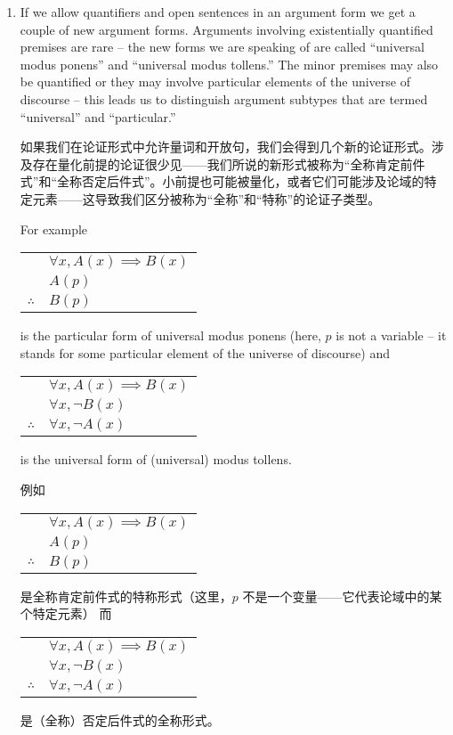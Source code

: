 \begin{enumerate}
{  \vfill
  }
  
  \workbookpagebreak
  
  \item If we allow quantifiers and open sentences in an argument form we
  get a couple of new argument forms.
  Arguments involving existentially quantified 
  premises are rare -- the new forms we are speaking of are called ``universal modus 
  ponens'' and ``universal modus tollens.''   The minor premises may also be quantified
  or they may involve particular elements of the universe of discourse -- this leads
  us to distinguish argument subtypes that are termed ``universal'' and ``particular.''
  
  如果我们在论证形式中允许量词和开放句，我们会得到几个新的论证形式。涉及存在量化前提的论证很少见——我们所说的新形式被称为“全称肯定前件式”和“全称否定后件式”。小前提也可能被量化，或者它们可能涉及论域的特定元素——这导致我们区分被称为“全称”和“特称”的论证子类型。
  
  For example  \begin{tabular}{cl}
   & $\forall x, A(x) \implies B(x)$ \\
   & $A(p)$ \\ \hline
  $\therefore$ & $B(p)$ \\
  \end{tabular}  is the particular form of universal modus ponens (here, $p$
  is not a variable -- it stands for some particular element of the universe of
  discourse)
  and \begin{tabular}{cl}
   & $\forall x, A(x) \implies B(x)$ \\
   & $\forall x, {\lnot}B(x)$ \\ \hline
  $\therefore$ & $\forall x, {\lnot}A(x)$ \\
  \end{tabular} is the universal form of (universal) modus tollens.
  
  例如 \begin{tabular}{cl}
   & $\forall x, A(x) \implies B(x)$ \\
   & $A(p)$ \\ \hline
  $\therefore$ & $B(p)$ \\
  \end{tabular} 是全称肯定前件式的特称形式（这里，$p$ 不是一个变量——它代表论域中的某个特定元素）
  而 \begin{tabular}{cl}
   & $\forall x, A(x) \implies B(x)$ \\
   & $\forall x, {\lnot}B(x)$ \\ \hline
  $\therefore$ & $\forall x, {\lnot}A(x)$ \\
  \end{tabular} 是（全称）否定后件式的全称形式。
  

\end{enumerate}
